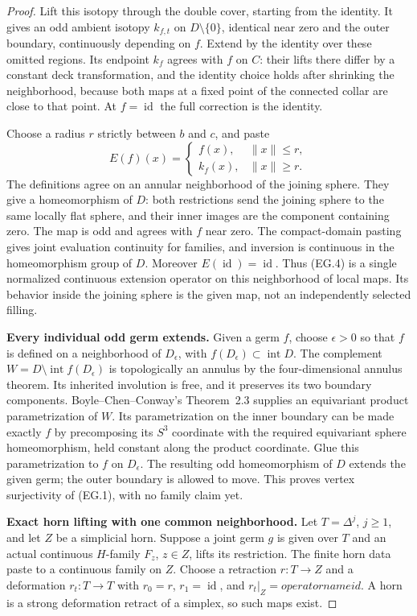 \begin{proof}
Lift this isotopy through the double cover, starting from the identity.
It gives an odd ambient isotopy $k_{f,t}$ on $D\setminus\{0\}$, identical
near zero and the outer boundary, continuously depending on $f$. Extend
by the identity over these omitted regions. Its endpoint $k_f$ agrees
with $f$ on $C$: their lifts there differ by a constant deck transformation,
and the identity choice holds after shrinking the neighborhood, because
both maps at a fixed point of the connected collar are close to that
point. At $f=\operatorname{id}$ the full correction is the identity.

Choose a radius $r$ strictly between $b$ and $c$, and paste
\[
 E(f)(x)=
 \begin{cases}
 f(x),&\|x\|\le r,\\
 k_f(x),&\|x\|\ge r.
 \end{cases}
 \tag{EG.4}
\]
The definitions agree on an annular neighborhood of the joining sphere.
They give a homeomorphism of $D$: both restrictions send the joining
sphere to the same locally flat sphere, and their inner images are the
component containing zero. The map is odd and agrees with $f$ near zero.
The compact-domain pasting gives joint evaluation continuity for families,
and inversion is continuous in the homeomorphism group of $D$.
Moreover $E(\operatorname{id})=\operatorname{id}$. Thus (EG.4) is a
single normalized continuous extension operator on this neighborhood of
local maps. Its behavior inside the joining sphere is the given map,
not an independently selected filling.

\textbf{Every individual odd germ extends.}\quad
Given a germ $f$, choose $\epsilon>0$ so that $f$ is defined on a
neighborhood of $D_\epsilon$, with $f(D_\epsilon)\subset\operatorname{int}D$.
The complement
$W=D\setminus\operatorname{int}f(D_\epsilon)$ is topologically an annulus
by the four-dimensional annulus theorem. Its inherited involution is free,
and it preserves its two boundary components. Boyle--Chen--Conway's
Theorem~2.3 supplies an equivariant product parametrization of $W$.
Its parametrization on the inner boundary can be made exactly $f$ by
precomposing its $S^3$ coordinate with the required equivariant sphere
homeomorphism, held constant along the product coordinate. Glue this
parametrization to $f$ on $D_\epsilon$. The resulting odd homeomorphism
of $D$ extends the given germ; the outer boundary is allowed to move.
This proves vertex surjectivity of (EG.1), with no family claim yet.

\textbf{Exact horn lifting with one common neighborhood.}\quad
Let $T=\Delta^j$, $j\ge1$, and let $Z$ be a simplicial horn. Suppose a
joint germ $g$ is given over $T$ and an actual continuous $H$-family
$F_z$, $z\in Z$, lifts its restriction. The finite horn data paste to a
continuous family on $Z$. Choose a retraction $r:T\to Z$ and a deformation
$r_t:T\to T$ with $r_0=r$, $r_1=\operatorname{id}$, and $r_t|_Z=operatorname{id}$.
A horn is a strong deformation retract of a simplex, so such maps exist.


\end{proof}
